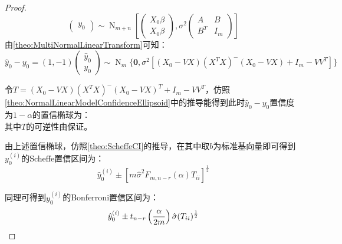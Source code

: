 \begin{proof}
\begin{equation*}
\begin{pmatrix}
			y_0
		\end{pmatrix}\sim\operatorname{N}_{m+n}\left[
		\begin{pmatrix}
			X_0\beta \\
			X_0\beta
		\end{pmatrix},\sigma^2
		\begin{pmatrix}
			A & B \\
			B^T & I_m
		\end{pmatrix}
		\right]
	\end{equation*}
	由\cref{theo:MultiNormalLinearTransform}可知：
	\begin{equation*}
		\hat{y}_0-y_0=
		(1,-1)
		\begin{pmatrix}
			\hat{y}_0 \\
			y_0
		\end{pmatrix}\sim\operatorname{N}_m\{
		\mathbf{0},\sigma^2[(X_0-VX)(X^TX)^-(X_0-VX)+I_m-VV^T]\}
	\end{equation*}\par
	令$T=(X_0-VX)(X^TX)^-(X_0-VX)^T+I_m-VV^T$，仿照\cref{theo:NormalLinearModelConfidenceEllipsoid}中的推导能得到此时$\hat{y}_0-y_0$置信度为$1-\alpha$的置信椭球为：
	\begin{equation*}
		[\hat{y}_0-y_0:(\hat{y}_0-y_0)^T(T)^{-1}(\hat{y}_0-y_0)\leqslant m\hat{\sigma}^2F_{m,n-r}(\alpha)]
	\end{equation*}
	其中$T$的可逆性由保证。\par
	由上述置信椭球，仿照\cref{theo:ScheffeCI}的推导，在其中取$b$为标准基向量即可得到$y_0^{(i)}$的Scheffe置信区间为：
	\begin{equation*}
		\hat{y}_0^{(i)}\pm[m\hat{\sigma}^2F_{m,n-r}(\alpha)T_{ii}]^{\frac{1}{2}}
	\end{equation*}\par
	同理可得到$y_0^{(i)}$的Bonferroni置信区间为：
	\begin{equation*}
		\hat{y}_0^{(i)}\pm t_{n-r}\left(\frac{\alpha}{2m}\right)\hat{\sigma}(T_{ii})^{\frac{1}{2}}\qedhere
	\end{equation*}
\end{proof}





